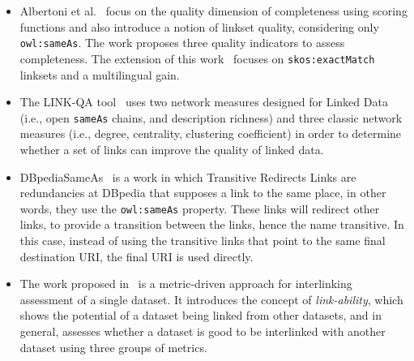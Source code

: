 \begin{itemize}
	\item Albertoni et al.~\cite{Albertoni:2013:ALQ:2457317.2457327} focus on the quality dimension of completeness using scoring functions and also introduce a notion of linkset quality, considering only \texttt{owl:sameAs}. The work proposes three quality indicators to assess completeness. The extension of this work~\cite{albertoni2015linkset} focuses on \texttt{skos:exactMatch} linksets and a multilingual gain. 
	
	
	\item The LINK-QA tool~\cite{Guret2012AssessingLD} uses two network measures designed for Linked Data (i.e., open \texttt{sameAs} chains, and description richness) and three classic network measures (i.e., degree, centrality, clustering coefficient) in order to determine whether a set of links can improve the quality of linked data. 
	
	\item DBpediaSameAs~\cite{valdestilhasdbpediasameas} is a work in which Transitive Redirects Links are redundancies at DBpedia that supposes a link to the same place, in other words, they use the \texttt{owl:sameAs} property. These links will redirect other links, to provide a transition between the links, hence the name transitive. In this case, instead of using the transitive links that point to the same final destination URI, the final URI is used directly. 
	
	\item The work proposed in~\cite{yaghouti2015metric} is a metric-driven approach for interlinking assessment of a single dataset. It introduces the concept of \emph{link-ability}, which shows the potential of a dataset being linked from other datasets, and in general, assesses whether a dataset is good to be interlinked with another dataset using three groups of metrics.
	

\end{itemize}
